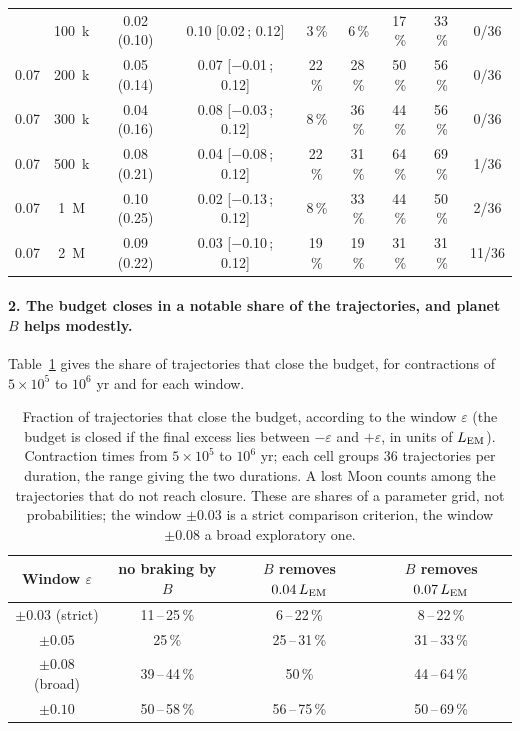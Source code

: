 \documentclass[11pt,a4paper]{article}
\newcommand{\LEM}{\ensuremath{L_{\rm EM}}}
\begin{document}
\begin{table}[htbp]
\begin{tabular}{ccccccccc}
\addlinespace
0.07 & 100~k & 0.02 (0.10) & 0.10 [0.02\,; 0.12] & 3\,\% & 6\,\% & 17\,\% & 33\,\% & 0/36 \\
0.07 & 200~k & 0.05 (0.14) & 0.07 [$-$0.01\,; 0.12] & 22\,\% & 28\,\% & 50\,\% & 56\,\% & 0/36 \\
0.07 & 300~k & 0.04 (0.16) & 0.08 [$-$0.03\,; 0.12] & 8\,\% & 36\,\% & 44\,\% & 56\,\% & 0/36 \\
0.07 & 500~k & 0.08 (0.21) & 0.04 [$-$0.08\,; 0.12] & 22\,\% & 31\,\% & 64\,\% & 69\,\% & 1/36 \\
0.07 & 1~M & 0.10 (0.25) & 0.02 [$-$0.13\,; 0.12] & 8\,\% & 33\,\% & 44\,\% & 50\,\% & 2/36 \\
0.07 & 2~M & 0.09 (0.22) & 0.03 [$-$0.10\,; 0.12] & 19\,\% & 19\,\% & 31\,\% & 31\,\% & 11/36 \\
\bottomrule\end{tabular}\end{table}

\paragraph{2. The budget closes in a notable share of the trajectories, and planet~$B$ helps modestly.} Table~\ref{tab:fenetres} gives the share of trajectories that close the budget, for contractions of $5\times10^5$ to $10^6$ yr and for each window.

\begin{table}[htbp]\centering\small
\caption{Fraction of trajectories that close the budget, according to the window $\varepsilon$ (the budget is closed if the final excess lies between $-\varepsilon$ and $+\varepsilon$, in units of $\LEM$). Contraction times from $5\times10^5$ to $10^6$ yr; each cell groups $36$ trajectories per duration, the range giving the two durations. A lost Moon counts among the trajectories that do not reach closure. These are shares of a parameter grid, not probabilities; the window $\pm0.03$ is a strict comparison criterion, the window $\pm0.08$ a broad exploratory one.\label{tab:fenetres}}
\begin{tabular}{cccc}\toprule
Window $\varepsilon$ & no braking by $B$ & $B$ removes $0.04\,\LEM$ & $B$ removes $0.07\,\LEM$ \\
\midrule
$\pm0.03$ (strict) & 11\,--\,25\,\% & 6\,--\,22\,\% & 8\,--\,22\,\% \\
$\pm0.05$ & 25\,\% & 25\,--\,31\,\% & 31\,--\,33\,\% \\
$\pm0.08$ (broad) & 39\,--\,44\,\% & 50\,\% & 44\,--\,64\,\% \\
$\pm0.10$ & 50\,--\,58\,\% & 56\,--\,75\,\% & 50\,--\,69\,\% \\
\bottomrule\end{tabular}\end{table}
\end{document}
